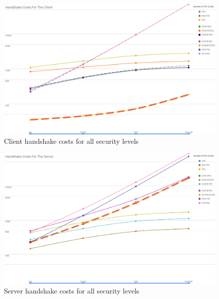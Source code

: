 \documentclass{llncs}
\begin{document}
\begin{figure}
  \centering
  \includegraphics[width=1.0\textwidth]{img/client_hs_costs_all_sls.png}
  \centering \caption{\label{fig:client-hs-cost-all-sls} Client handshake costs for all security levels}
\end{figure}

\begin{figure}
  \centering
  \includegraphics[width=1.0\textwidth]{img/server_hs_costs_all_sls.png}
  \centering \caption{\label{fig:server-hs-cost-all-sls} Server handshake costs for all security levels}
\end{figure}
\end{document}
